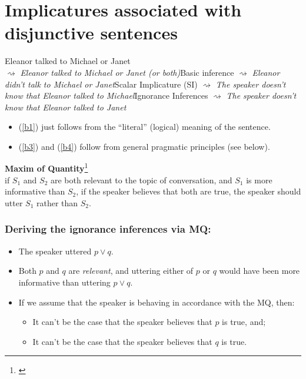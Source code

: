 \documentclass[landscape,cronos,paper=letter]{ling-handout}
\begin{document}
\section{Implicatures associated with disjunctive sentences}

\pex
Eleanor talked to Michael or Janet\\
\a\label{b1}$⇝$ \textit{Eleanor talked to Michael or Janet (or both)}\hfill Basic inference
\a\label{b2}$⇝$ \textit{Eleanor didn't talk to Michael or Janet}\hfill Scalar Implicature (SI)
\a\label{b3}$⇝$ \textit{The speaker doesn't know that Eleanor talked to Michael}\hfill Ignorance Inferences
\a\label{b4}$⇝$ \textit{The speaker doesn't know that Eleanor talked to Janet}
\xe

\begin{itemize}

    \item (\ref{b1}) just follows from the \enquote{literal} (logical) meaning of the sentence.

    \item (\ref{b3}) and (\ref{b4}) follow from general pragmatic principles (see below).

\end{itemize}

\ex
\textbf{Maxim of Quantity}\footnote{\cite[p.\,73]{fox2007}}\\
if $S_{1}$ and $S_{2}$ are both relevant to the topic of conversation, and $S_{1}$ is more informative than $S_{2}$, if the speaker believes that both are true, the speaker should utter $S_{1}$ rather than $S_{2}$.
\xe

\subsubsection*{Deriving the ignorance inferences via MQ:}

\begin{itemize}

    \item The speaker uttered $p ∨ q$.

    \item Both $p$ and $q$ are \textit{relevant}, and uttering either of $p$ or $q$ would have been more informative than uttering $p ∨ q$.

  \item If we assume that the speaker is behaving in accordance with the MQ, then:

    \begin{itemize}

        \item It can't be the case that the speaker believes that $p$ is true, and;

        \item It can't be the case that the speaker believes that $q$ is true.

    \end{itemize}

\end{itemize}
\end{document}

